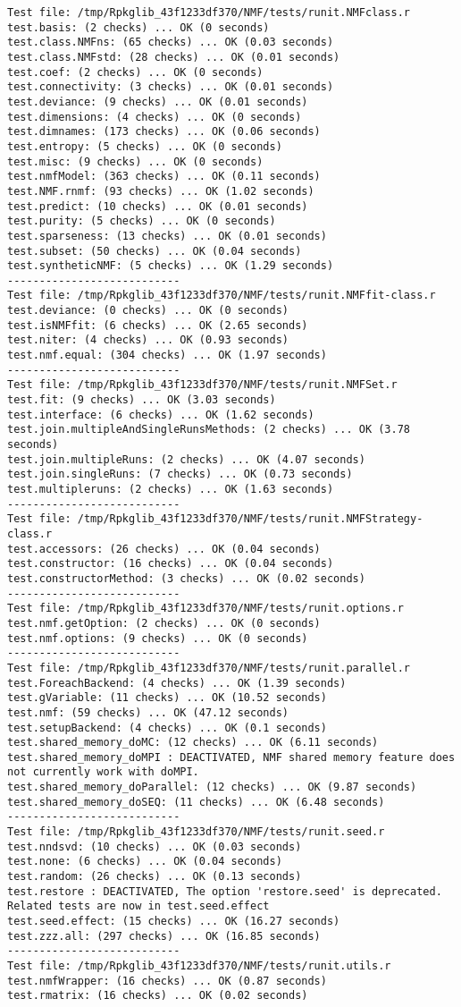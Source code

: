 \documentclass[10pt]{article}\usepackage[]{graphicx}\usepackage[]{color}
\begin{document}
\begin{verbatim}
Test file: /tmp/Rpkglib_43f1233df370/NMF/tests/runit.NMFclass.r 
test.basis: (2 checks) ... OK (0 seconds)
test.class.NMFns: (65 checks) ... OK (0.03 seconds)
test.class.NMFstd: (28 checks) ... OK (0.01 seconds)
test.coef: (2 checks) ... OK (0 seconds)
test.connectivity: (3 checks) ... OK (0.01 seconds)
test.deviance: (9 checks) ... OK (0.01 seconds)
test.dimensions: (4 checks) ... OK (0 seconds)
test.dimnames: (173 checks) ... OK (0.06 seconds)
test.entropy: (5 checks) ... OK (0 seconds)
test.misc: (9 checks) ... OK (0 seconds)
test.nmfModel: (363 checks) ... OK (0.11 seconds)
test.NMF.rnmf: (93 checks) ... OK (1.02 seconds)
test.predict: (10 checks) ... OK (0.01 seconds)
test.purity: (5 checks) ... OK (0 seconds)
test.sparseness: (13 checks) ... OK (0.01 seconds)
test.subset: (50 checks) ... OK (0.04 seconds)
test.syntheticNMF: (5 checks) ... OK (1.29 seconds)
--------------------------- 
Test file: /tmp/Rpkglib_43f1233df370/NMF/tests/runit.NMFfit-class.r 
test.deviance: (0 checks) ... OK (0 seconds)
test.isNMFfit: (6 checks) ... OK (2.65 seconds)
test.niter: (4 checks) ... OK (0.93 seconds)
test.nmf.equal: (304 checks) ... OK (1.97 seconds)
--------------------------- 
Test file: /tmp/Rpkglib_43f1233df370/NMF/tests/runit.NMFSet.r 
test.fit: (9 checks) ... OK (3.03 seconds)
test.interface: (6 checks) ... OK (1.62 seconds)
test.join.multipleAndSingleRunsMethods: (2 checks) ... OK (3.78 seconds)
test.join.multipleRuns: (2 checks) ... OK (4.07 seconds)
test.join.singleRuns: (7 checks) ... OK (0.73 seconds)
test.multipleruns: (2 checks) ... OK (1.63 seconds)
--------------------------- 
Test file: /tmp/Rpkglib_43f1233df370/NMF/tests/runit.NMFStrategy-class.r 
test.accessors: (26 checks) ... OK (0.04 seconds)
test.constructor: (16 checks) ... OK (0.04 seconds)
test.constructorMethod: (3 checks) ... OK (0.02 seconds)
--------------------------- 
Test file: /tmp/Rpkglib_43f1233df370/NMF/tests/runit.options.r 
test.nmf.getOption: (2 checks) ... OK (0 seconds)
test.nmf.options: (9 checks) ... OK (0 seconds)
--------------------------- 
Test file: /tmp/Rpkglib_43f1233df370/NMF/tests/runit.parallel.r 
test.ForeachBackend: (4 checks) ... OK (1.39 seconds)
test.gVariable: (11 checks) ... OK (10.52 seconds)
test.nmf: (59 checks) ... OK (47.12 seconds)
test.setupBackend: (4 checks) ... OK (0.1 seconds)
test.shared_memory_doMC: (12 checks) ... OK (6.11 seconds)
test.shared_memory_doMPI : DEACTIVATED, NMF shared memory feature does not currently work with doMPI.
test.shared_memory_doParallel: (12 checks) ... OK (9.87 seconds)
test.shared_memory_doSEQ: (11 checks) ... OK (6.48 seconds)
--------------------------- 
Test file: /tmp/Rpkglib_43f1233df370/NMF/tests/runit.seed.r 
test.nndsvd: (10 checks) ... OK (0.03 seconds)
test.none: (6 checks) ... OK (0.04 seconds)
test.random: (26 checks) ... OK (0.13 seconds)
test.restore : DEACTIVATED, The option 'restore.seed' is deprecated. Related tests are now in test.seed.effect
test.seed.effect: (15 checks) ... OK (16.27 seconds)
test.zzz.all: (297 checks) ... OK (16.85 seconds)
--------------------------- 
Test file: /tmp/Rpkglib_43f1233df370/NMF/tests/runit.utils.r 
test.nmfWrapper: (16 checks) ... OK (0.87 seconds)
test.rmatrix: (16 checks) ... OK (0.02 seconds)


\end{verbatim}
\end{document}
